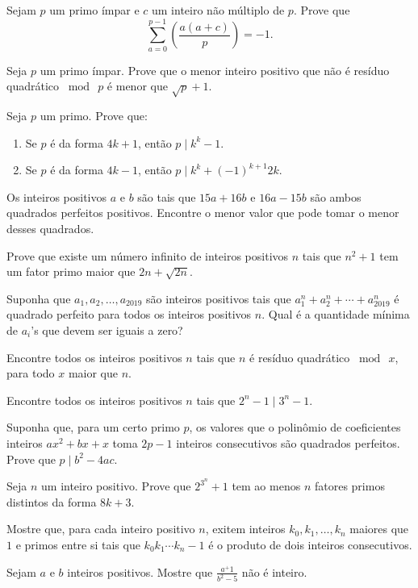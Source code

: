 \documentclass[10pt,a4paper]{article}
\newcommand{\leg}[2]{\left(\frac{#1}{#2}\right)}
\newcommand{\tmod}[1]{\bmod{\ #1}}
\begin{document}
	\begin{prob}
		Sejam $p$ um primo ímpar e $c$ um inteiro não múltiplo de $p$. Prove que
		$$\sum_{a = 0}^{p-1}\leg{a(a+c)}{p} = -1.$$
	\end{prob}
	\begin{prob}
		Seja $p$ um primo ímpar. Prove que o menor inteiro positivo que não é resíduo quadrático $\tmod{p}$ é menor que $\sqrt{p} + 1$.
	\end{prob}
	\begin{prob}
		Seja $p$ um primo. Prove que:
		\begin{enumerate}[label = (\alph*)]
			\item Se $p$ é da forma $4k+1$, então $p \mid k^k - 1$.
			\item Se $p$ é da forma $4k-1$, então $p \mid k^k + (-1)^{k+1}2k$.
		\end{enumerate}
	\end{prob}
	\begin{prob}[IMO]
		Os inteiros positivos $a$ e $b$ são tais que $15a + 16b$ e $16a - 15b$ são ambos quadrados perfeitos positivos. Encontre o menor valor que pode tomar o menor desses quadrados.
	\end{prob}
	\begin{prob}[IMO]
		Prove que existe um número infinito de inteiros positivos $n$ tais que $n^2 + 1$ tem um fator primo maior que $2n + \sqrt{2n}$.
	\end{prob}
	\begin{prob}
		Suponha que $a_1, a_2, \dots, a_{2019}$ são inteiros positivos tais que $a_1^n + a_2^n + \cdots + a_{2019}^n$ é quadrado perfeito para todos os inteiros positivos $n$. Qual é a quantidade mínima de $a_i$'s que devem ser iguais a zero?
	\end{prob}
	\begin{prob}
		Encontre todos os inteiros positivos $n$ tais que $n$ é resíduo quadrático $\tmod{x}$, para todo $x$ maior que $n$.
	\end{prob}
	\begin{prob}
		Encontre todos os inteiros positivos $n$ tais que $2^n - 1 \mid 3^n - 1$.
	\end{prob}
	\begin{prob}
		Suponha que, para um certo primo $p$, os valores que o polinômio de coeficientes inteiros $ax^2 + bx + x$ toma $2p-1$ inteiros consecutivos são quadrados perfeitos. Prove que $p \mid b^2 - 4ac$.
	\end{prob}
	\begin{prob}
		Seja $n$ um inteiro positivo. Prove que $2^{3^n} + 1$ tem ao menos $n$ fatores primos distintos da forma $8k + 3$.
	\end{prob}
	\begin{prob}
		Mostre que, para cada inteiro positivo $n$, exitem inteiros $k_0, k_1, \dots, k_n$ maiores que $1$ e primos entre si tais que $k_0k_1\cdots k_n - 1$ é o produto de dois inteiros consecutivos.
	\end{prob}
	\begin{prob}
		Sejam $a$ e $b$ inteiros positivos. Mostre que $\frac{a^+1}{b^2-5}$ não é inteiro.
	\end{prob}
\end{document}
